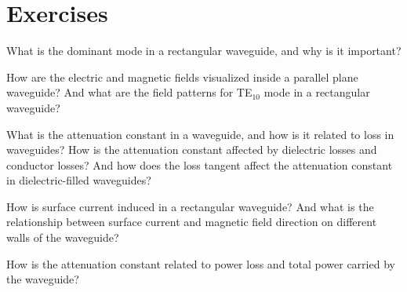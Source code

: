 \section*{Exercises}
\begin{ExerciseList}
\Exercise[label={ex411}]
What is the dominant mode in a rectangular waveguide, and why is it important?

\Exercise[label={ex412}]
How are the electric and magnetic fields visualized inside a parallel plane waveguide? And what are the field patterns for TE$_{10}$ mode in a rectangular waveguide?

\Exercise[label={ex413}]
What is the attenuation constant in a waveguide, and how is it related to loss in waveguides? How is the attenuation constant affected by dielectric losses and conductor losses? And how does the loss tangent affect the attenuation constant in dielectric-filled waveguides?

\Exercise[label={ex414}]
How is surface current induced in a rectangular waveguide? And what is the relationship between surface current and magnetic field direction on different walls of the waveguide?

\Exercise[label={ex415}]
How is the attenuation constant related to power loss and total power carried by the waveguide?
\end{ExerciseList}
